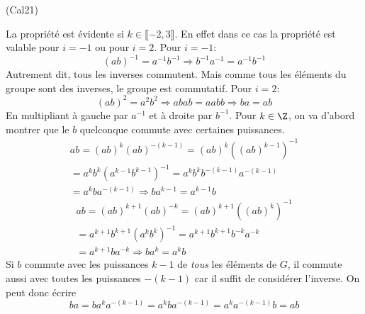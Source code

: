 \begin{tiny}(Cal21)\end{tiny} La propriété est évidente si $k\in \llbracket -2, 3\rrbracket$. En effet dans ce cas la propriété est valable pour $i=-1$ ou pour $i=2$.
Pour $i= -1$:
\begin{displaymath}
  (ab)^{-1} = a^{-1}b^{-1}\Rightarrow b^{-1}a^{-1} = a^{-1}b^{-1}
\end{displaymath}
Autrement dit, tous les inverses commutent. Mais comme tous les éléments du groupe sont des inverses, le groupe est commutatif.\newline
Pour $i=2$:
\begin{displaymath}
  (ab)^{2} = a^2 b^2 \Rightarrow abab = aabb\Rightarrow ba = ab
\end{displaymath}
En multipliant à gauche par $a^{-1}$ et à droite par $b^{-1}$.\newline
Pour $k\in \Z$, on va d'abord montrer que le $b$ quelconque commute avec certaines puissances.
\begin{multline*}
ab = (ab)^{k}(ab)^{-(k-1)} 
= (ab)^{k} ((ab)^{k-1})^{-1}\\
= a^k b^k (a^{k-1}b^{k-1})^{-1} 
= a^{k} b^{k} b^{-(k-1)} a^{-(k-1)}\\
= a^{k} b a^{-(k-1)}
\Rightarrow b a^{k-1} = a^{k-1} b 
\end{multline*}
\begin{multline*}
ab = (ab)^{k+1}(ab)^{-k} 
= (ab)^{k+1} ((ab)^{k})^{-1}\\
= a^{k+1} b^{k+1} (a^{k}b^{k})^{-1} 
= a^{k+1} b^{k+1} b^{-k} a^{-k}\\
= a^{k+1} b a^{-k}
\Rightarrow b a^{k} = a^{k} b 
\end{multline*}
Si $b$ commute avec les puissances $k-1$ de  \emph{tous} les éléments de $G$, il commute aussi avec toutes les puissances $-(k-1)$ car il suffit de considérer l'inverse. On peut donc écrire
\begin{displaymath}
  ba = ba^k a^{-(k-1)} = a^k b a^{-(k-1)} = a^k a^{-(k-1)}b = ab 
\end{displaymath}
